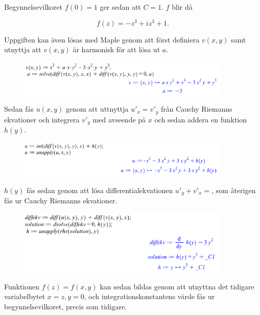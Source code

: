 \documentclass[a4paper]{article}
\begin{document}
Begynnelsevilkoret $f(0) = 1$ ger sedan att $C = 1$. $f$ blir då

\begin{equation*}
	f(z) = - z^3 + iz^3 + 1.
\end{equation*}

Uppgiften kan även lösas med Maple genom att först definiera $v(x,y)$ samt utnyttja att $v(x,y)$ är harmonisk för att lösa ut $a$.

\begin{figure}[h!]
	\centering
	\includegraphics[width=0.9\textwidth]{maple_11_1.png}
\end{figure}

Sedan fås $u(x,y)$ genom att uttnyttja $u'_x = v'_y$ från Cauchy Riemanns ekvationer och integrera $v'_y$ med avseende på $x$ och sedan addera en funktion $h(y)$.

\begin{figure}[h!]
	\centering
	\includegraphics[width=0.9\textwidth]{maple_11_2.png}
\end{figure}

$h(y)$ fås sedan genom att lösa differentialekvationen $u'_y + v'_x = $, som återigen fås ur Cauchy Riemanns ekvationer.

\begin{figure}[h!]
	\centering
	\includegraphics[width=0.9\textwidth]{maple_11_3.png}
\end{figure}

Funktionen $f(z) = f(x, y)$ kan sedan bildas genom att utnyttna det tidigare variabelbytet $x = z, y = 0$, och integrationskonstantens värde fås ur begynnelsevilkoret, precis som tidigare.
\end{document}
